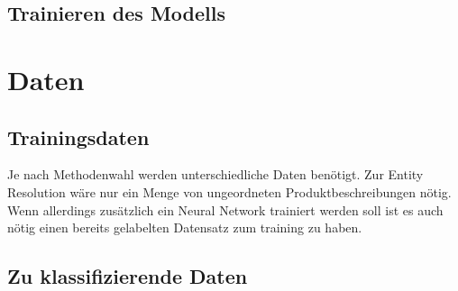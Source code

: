 \documentclass[paper=a4,12pt,listof=totoc]{scrartcl}%
\begin{document}
	\subsection{Trainieren des Modells}
	
	\section{Daten}
	\subsection{Trainingsdaten}
		Je nach Methodenwahl werden unterschiedliche Daten benötigt. Zur Entity Resolution wäre nur ein Menge von ungeordneten Produktbeschreibungen nötig. Wenn allerdings zusätzlich ein Neural Network trainiert werden soll ist es auch nötig einen bereits gelabelten Datensatz zum training zu haben.
	\subsection{Zu klassifizierende Daten}
	\printbibliography[title=Literaturverzeichnis]
\end{document}
